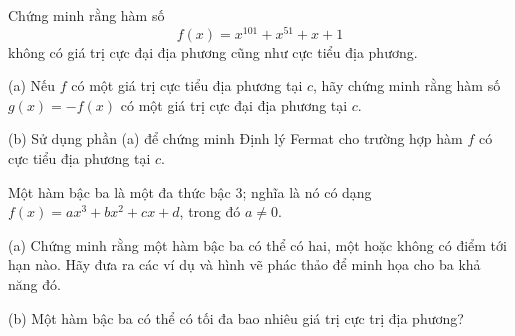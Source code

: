 \begin{minipage}[t]{0.482\textwidth}
 Chứng minh rằng hàm số
\[
f(x) = x^{101} + x^{51} + x + 1
\]
không có giá trị cực đại địa phương cũng như cực tiểu địa phương.

 (a) Nếu $f$ có một giá trị cực tiểu địa phương tại $c$, hãy chứng minh rằng hàm số $g(x) = -f(x)$ có một giá trị cực đại địa phương tại $c$.

\vspace{1.5pt}
(b) Sử dụng phần (a) để chứng minh Định lý Fermat cho trường hợp hàm $f$ có cực tiểu địa phương tại $c$.

 Một hàm bậc ba là một đa thức bậc 3; nghĩa là nó có dạng $f(x) = ax^3 + bx^2 + cx + d$, trong đó $a \neq 0$.

\vspace{1.5pt}
(a) Chứng minh rằng một hàm bậc ba có thể có hai, một hoặc không có điểm tới hạn nào. Hãy đưa ra các ví dụ và hình vẽ phác thảo để minh họa cho ba khả năng đó.

\vspace{1.5pt}
(b) Một hàm bậc ba có thể có tối đa bao nhiêu giá trị cực trị địa phương?
\end{minipage}
